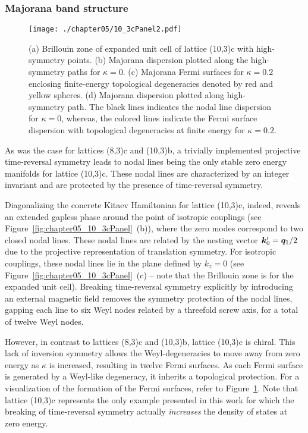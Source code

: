 %
%
\subsubsection{Majorana band structure}
%
%
%
\begin{figure}[tb]
	\centering
	\texttt{[image: ./chapter05/10\_3cPanel2.pdf]}
	\caption{
		(a) Brillouin zone of expanded unit cell of lattice (10,3)c with high-symmetry points.
		(b) Majorana dispersion plotted along the high-symmetry paths for $\kappa = 0$.
		(c) Majorana Fermi surfaces for $\kappa = 0.2$ enclosing finite-energy topological degeneracies denoted by red and yellow spheres.
		(d) Majorana dispersion plotted along high-symmetry path.
		The black lines indicates the nodal line dispersion for $\kappa = 0$, whereas, the colored lines indicate the Fermi surface dispersion with topological degeneracies at finite energy for $\kappa = 0.2$.
	}
	\label{fig:chapter05_10_3cPanel2}
\end{figure}
%
As was the case for lattices (8,3)c and (10,3)b, a trivially implemented projective time-reversal symmetry leads to nodal lines being the only stable zero energy manifolds for lattice (10,3)c.
These nodal lines are characterized by an integer invariant and are protected by the presence of time-reversal symmetry.

Diagonalizing the concrete Kitaev Hamiltonian for lattice (10,3)c, indeed, reveals an extended gapless phase around the point of isotropic couplings (see Figure~\ref{fig:chapter05_10_3cPanel}~(b)), where the zero modes correspond to two closed nodal lines.
These nodal lines are related by the nesting vector $\bm{k}'_0 = \bm{q}_1 / 2$ due to the projective representation of translation symmetry.
For isotropic couplings, these nodal lines lie in the plane defined by $k_z = 0$ (see Figure~\ref{fig:chapter05_10_3cPanel}~(c) -- note that the Brillouin zone is for the expanded unit cell).
Breaking time-reversal symmetry explicitly by introducing an external magnetic field removes the symmetry protection of the nodal lines, gapping each line to six Weyl nodes related by a threefold screw axis, for a total of twelve Weyl nodes.

However, in contrast to lattices (8,3)c and (10,3)b, lattice (10,3)c is chiral.
This lack of inversion symmetry allows the Weyl-degeneracies to move away from zero energy as $\kappa$ is increased, resulting in twelve Fermi surfaces.
As each Fermi surface is generated by a Weyl-like degeneracy, it inherits a topological protection.
For a visualization of the formation of the Fermi surfaces, refer to Figure~\ref{fig:chapter05_10_3cPanel2}.
Note that lattice (10,3)c represents the only example presented in this work for which the breaking of time-reversal symmetry actually \textit{increases} the density of states at zero energy.


